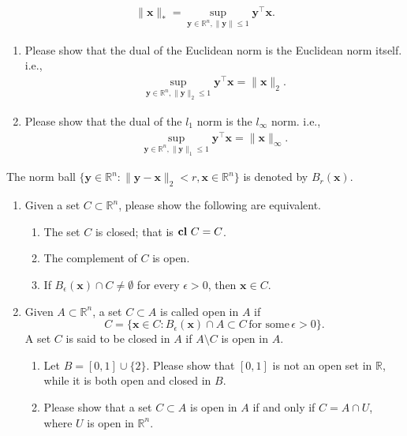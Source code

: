 \documentclass[11pt,letter,notitlepage]{article}
\DeclareMathOperator*{\cl}{\bf cl\,}
\theoremstyle{definition}
\begin{document}
\begin{exercise}[Norms]
\begin{enumerate}
\begin{align*}
			\|\mathbf{x}\|_* = \sup_{\mathbf{y}\in \mathbb{R}^n, \|\mathbf{y}\|\le 1}\mathbf{y}^{\top}\mathbf{x}.
		\end{align*}
		\begin{enumerate}
			\item Please show that the dual of the Euclidean norm is the Euclidean norm itself. i.e., 
			\begin{align*}
				\sup_{\mathbf{y}\in \mathbb{R}^n, \|\mathbf{y}\|_2\le 1}\mathbf{y}^{\top}\mathbf{x} = \|\mathbf{x}\|_2.
			\end{align*}
			\item Please show that the dual of the $l_1$ norm is the $l_{\infty}$ norm. i.e.,
			\begin{align*}
				\sup_{\mathbf{y}\in \mathbb{R}^n, \|\mathbf{y}\|_1\le 1}\mathbf{y}^{\top}\mathbf{x} = \|\mathbf{x}\|_{\infty}.
			\end{align*}
		\end{enumerate}
    \end{enumerate}
\end{exercise}

\newpage

\begin{exercise}
    The norm ball $\{\mathbf{y} \in \mathbb{R}^n:\|\mathbf{y}-\mathbf{x}\|_2<r, \mathbf{x}\in \mathbb{R}^n\}$ is denoted by $B_r(\mathbf{x})$.
    \begin{enumerate}
        \item Given a set $C \subset \mathbb{R}^n$, please show the following are equivalent.
        \begin{enumerate}
            \item The set $C$ is closed; that is $\cl C=C$.
            \item The complement of $C$ is open.
            \item If $B_{\epsilon}(\mathbf{x})\cap C \not=\emptyset$ for every $\epsilon>0$, then $\mathbf{x}\in C$.
        \end{enumerate}
        \item Given $A\subset\mathbb{R}^n$, a set $C\subset A$ is called open in $A$ if $$C=\{\mathbf{x}\in C: B_{\epsilon}(\mathbf{x})\cap A \subset C\,\text{for some}\, \epsilon>0\}.$$
        A set $C$ is said to be closed in $A$ if $A\setminus C$ is open in $A$.
        \begin{enumerate}
            \item Let $B= [0,1] \cup \{2\}$.  Please show that $[0,1]$ is not an open set in $\mathbb{R}$, while it is both open and closed in $B$.
            \item Please show that a set $C \subset A$ is open in $A$ if and only if $C=A\cap U$, where $U$ is open in $\mathbb{R}^n$.
        \end{enumerate}

    \end{enumerate}
\end{exercise}
\end{document}
